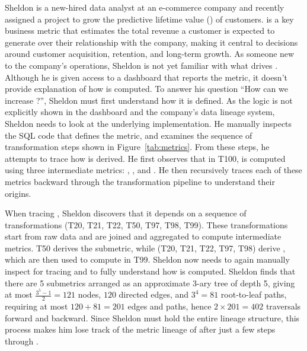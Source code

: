\begin{example}
Sheldon is a new-hired data analyst at an e-commerce company and recently assigned a
project to grow the predictive lifetime value () of customers.  is a key business metric that estimates the total revenue a customer is expected to generate over their relationship with the company, making it central to decisions around customer acquisition, retention, and long-term growth. As someone new to the company’s operations, Sheldon is not yet familiar with what drives . Although he is given access to a dashboard that reports the metric, it doesn't provide explanation of how  is computed. To answer his question ``How can we increase ?'', Sheldon must first understand how it is defined.
%
As the logic is not explicitly shown in the dashboard and the company's data lineage system, Sheldon
needs to look at the underlying implementation. He manually inspects the SQL code that defines the metric, and examines the
sequence of transformation steps shown in Figure~\ref{tab:metrics}. From these
steps, he attempts to trace how  is derived. He first observes that
in T100,  is computed using three intermediate metrics:
, , and
. He then recursively traces each of these
metrics backward through the transformation pipeline to understand their
origins. 

When tracing , Sheldon discovers that it depends
on a sequence of transformations (T20, T21, T22, T50, T97, T98, T99). These
transformations start from raw data and are joined and aggregated to compute
intermediate metrics. T50 derives the  submetric, while (T20,
T21, T22, T97, T98) derive , which are then used
to compute  in T99. Sheldon now needs to again
manually inspect for tracing  and 
to fully understand how  is computed. %
Sheldon finds that there are
5 submetrics arranged as an approximate 3-ary tree of depth 5, giving at most
$\frac{3^5-1}{2} = 121$ nodes, $120$ directed edges, and $3^4 = 81$ root-to-leaf
paths, requiring at most $120 + 81 = 201$ edges and paths, hence $2 \times 201 =
402$ traversals forward and backward. Since Sheldon must hold the entire lineage
structure, this process makes him lose track of the metric lineage of
 after just a few steps through .
\end{example}

